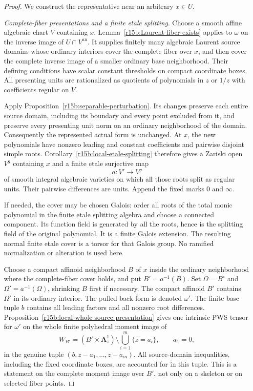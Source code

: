 \begin{proof}
We construct the representative near an arbitrary $x\in U$.

\emph{Complete-fiber presentations and a finite etale splitting.}
Choose a smooth affine algebraic chart $V$ containing $x$.
Lemma~\ref{r15b:Laurent-fiber-exists} applies to $\omega$ on the
inverse image of $U\cap V^{\mathrm{an}}$.  It supplies finitely
many algebraic Laurent source domains whose ordinary interiors
cover the complete fiber over $x$, and then cover the complete
inverse image of a smaller ordinary base neighborhood.  Their
defining conditions have scalar constant thresholds on compact
coordinate boxes.  All presenting units are rationalized as
quotients of polynomials in $z$ or $1/z$ with coefficients regular
on $V$.

Apply Proposition~\ref{r15b:separable-perturbation}.  Its changes
preserve each entire source domain, including its boundary and
every point excluded from it, and preserve every presenting unit
norm on an ordinary neighborhood of the domain.  Consequently
the represented actual form is unchanged.  At $x$, the new
polynomials have nonzero leading and constant coefficients and
pairwise disjoint simple roots.  Corollary~\ref{r15b:local-etale-splitting}
therefore gives a Zariski open $V^g$ containing $x$ and a finite
etale surjective map
\[
                    a:V'\longrightarrow V^g
\tag{HP15.3}\label{r15hp:local-cover}
\]
of smooth integral algebraic varieties on which all those roots
split as regular units.  Their pairwise differences are units.
Append the fixed marks $0$ and $\infty$.

If needed, the cover may be chosen Galois: order all roots of the
total monic polynomial in the finite etale splitting algebra and
choose a connected component.  Its function field is generated
by all the roots, hence is the splitting field of the original
polynomial.  It is a finite Galois extension.  The resulting
normal finite etale cover is a torsor for that Galois group.
No ramified normalization or alteration is used here.

Choose a compact affinoid neighborhood $B$ of $x$ inside the
ordinary neighborhood where the complete-fiber cover holds, and
put $B'=a^{-1}(B)$.  Set $\Omega=B^\circ$ and
$\Omega'=a^{-1}(\Omega)$, shrinking $B$ first if necessary.
The compact affinoid $B'$ contains $\Omega'$ in its ordinary
interior.  The pulled-back form is denoted $\omega'$.  The
finite base tuple $b$ contains all leading factors and all
nonzero root differences.  Proposition~\ref{r15b:local-whole-source-presentation}
gives one intrinsic PWS tensor for $\omega'$ on the whole finite
polyhedral moment image of
\[
 W_{B'}=(B'\times\mathbf A^1_z)\setminus
                         \bigcup_{i=1}^m\{z=a_i\},
 \qquad a_1=0,
\tag{HP15.4}\label{r15hp:whole-source}
\]
in the genuine tuple $(b,z-a_1,\ldots,z-a_m)$.  All source-domain
inequalities, including the fixed coordinate boxes, are accounted
for in this tuple.  This is a statement on the complete moment
image over $B'$, not only on a skeleton or on selected fiber
points.


\end{proof}

